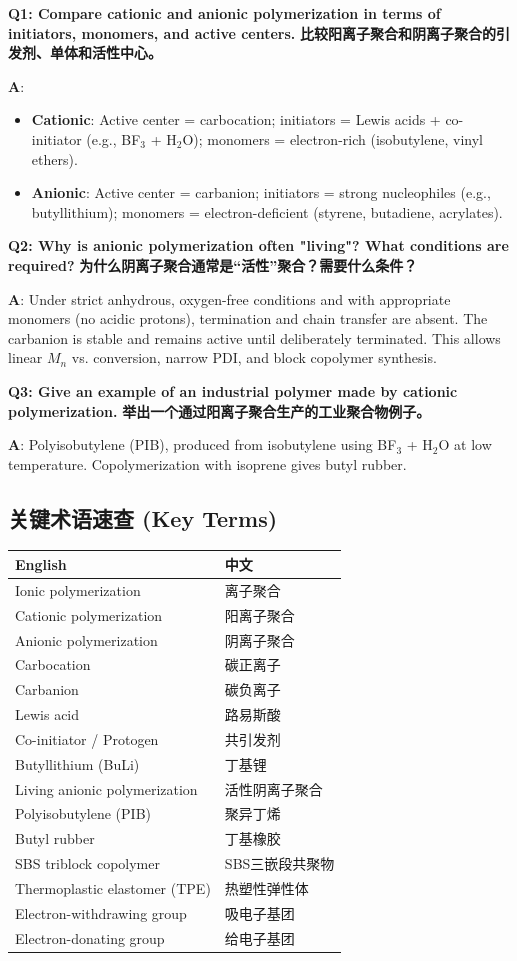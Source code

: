 \documentclass[12pt,a4paper]{ctexart}
\begin{document}
\textbf{Q1: Compare cationic and anionic polymerization in terms of initiators, monomers, and active centers.}  
\textbf{比较阳离子聚合和阴离子聚合的引发剂、单体和活性中心。}

\textbf{A}: 
\begin{itemize}
    \item \textbf{Cationic}: Active center = carbocation; initiators = Lewis acids + co-initiator (e.g., BF$_3$ + H$_2$O); monomers = electron-rich (isobutylene, vinyl ethers).
    \item \textbf{Anionic}: Active center = carbanion; initiators = strong nucleophiles (e.g., butyllithium); monomers = electron-deficient (styrene, butadiene, acrylates).
\end{itemize}

\textbf{Q2: Why is anionic polymerization often "living"? What conditions are required?}  
\textbf{为什么阴离子聚合通常是“活性”聚合？需要什么条件？}

\textbf{A}: Under strict anhydrous, oxygen-free conditions and with appropriate monomers (no acidic protons), termination and chain transfer are absent. The carbanion is stable and remains active until deliberately terminated. This allows linear $M_n$ vs. conversion, narrow PDI, and block copolymer synthesis.

\textbf{Q3: Give an example of an industrial polymer made by cationic polymerization.}  
\textbf{举出一个通过阳离子聚合生产的工业聚合物例子。}

\textbf{A}: Polyisobutylene (PIB), produced from isobutylene using BF$_3$ + H$_2$O at low temperature. Copolymerization with isoprene gives butyl rubber.

\subsection{关键术语速查 (Key Terms)}

\begin{longtable}{p{5.5cm}p{5.5cm}}
\toprule
\textbf{English} & \textbf{中文} \\
\midrule
Ionic polymerization & 离子聚合 \\
Cationic polymerization & 阳离子聚合 \\
Anionic polymerization & 阴离子聚合 \\
Carbocation & 碳正离子 \\
Carbanion & 碳负离子 \\
Lewis acid & 路易斯酸 \\
Co-initiator / Protogen & 共引发剂 \\
Butyllithium (BuLi) & 丁基锂 \\
Living anionic polymerization & 活性阴离子聚合 \\
Polyisobutylene (PIB) & 聚异丁烯 \\
Butyl rubber & 丁基橡胶 \\
SBS triblock copolymer & SBS三嵌段共聚物 \\
Thermoplastic elastomer (TPE) & 热塑性弹性体 \\
Electron-withdrawing group & 吸电子基团 \\
Electron-donating group & 给电子基团 \\
\bottomrule
\end{longtable}
\end{document}

